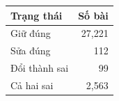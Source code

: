 \begin{tabularx}{\linewidth}{>{\raggedright\arraybackslash}Xr}
\toprule
Trạng thái & Số bài\\\midrule
Giữ đúng & 27,221\\
Sửa đúng & 112\\
Đổi thành sai & 99\\
Cả hai sai & 2,563\\
\bottomrule\end{tabularx}

